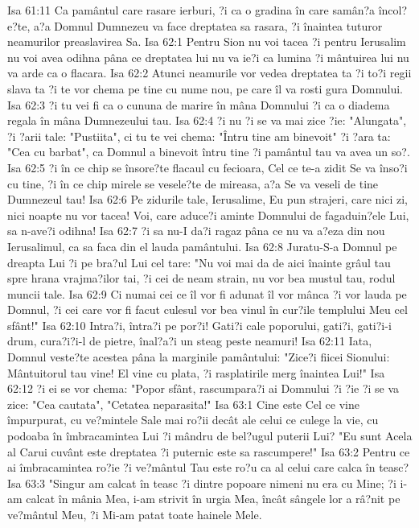 Isa 61:11  Ca pamântul care rasare ierburi, ?i ca o gradina în care samân?a încol?e?te, a?a Domnul Dumnezeu va face dreptatea sa rasara, ?i înaintea tuturor neamurilor preaslavirea Sa.
Isa 62:1  Pentru Sion nu voi tacea ?i pentru Ierusalim nu voi avea odihna pâna ce dreptatea lui nu va ie?i ca lumina ?i mântuirea lui nu va arde ca o flacara.
Isa 62:2  Atunci neamurile vor vedea dreptatea ta ?i to?i regii slava ta ?i te vor chema pe tine cu nume nou, pe care îl va rosti gura Domnului.
Isa 62:3  ?i tu vei fi ca o cununa de marire în mâna Domnului ?i ca o diadema regala în mâna Dumnezeului tau.
Isa 62:4  ?i nu ?i se va mai zice ?ie: "Alungata", ?i ?arii tale: "Pustiita", ci tu te vei chema: "Întru tine am binevoit" ?i ?ara ta: "Cea cu barbat", ca Domnul a binevoit întru tine ?i pamântul tau va avea un so?.
Isa 62:5  ?i în ce chip se însore?te flacaul cu fecioara, Cel ce te-a zidit Se va înso?i cu tine, ?i în ce chip mirele se vesele?te de mireasa, a?a Se va veseli de tine Dumnezeul tau!
Isa 62:6  Pe zidurile tale, Ierusalime, Eu pun strajeri, care nici zi, nici noapte nu vor tacea! Voi, care aduce?i aminte Domnului de fagaduin?ele Lui, sa n-ave?i odihna!
Isa 62:7  ?i sa nu-I da?i ragaz pâna ce nu va a?eza din nou Ierusalimul, ca sa faca din el lauda pamântului.
Isa 62:8  Juratu-S-a Domnul pe dreapta Lui ?i pe bra?ul Lui cel tare: "Nu voi mai da de aici înainte grâul tau spre hrana vrajma?ilor tai, ?i cei de neam strain, nu vor bea mustul tau, rodul muncii tale.
Isa 62:9  Ci numai cei ce îl vor fi adunat îl vor mânca ?i vor lauda pe Domnul, ?i cei care vor fi facut culesul vor bea vinul în cur?ile templului Meu cel sfânt!"
Isa 62:10  Intra?i, întra?i pe por?i! Gati?i cale poporului, gati?i, gati?i-i drum, cura?i?i-l de pietre, înal?a?i un steag peste neamuri!
Isa 62:11  Iata, Domnul veste?te acestea pâna la marginile pamântului: "Zice?i fiicei Sionului: Mântuitorul tau vine! El vine cu plata, ?i rasplatirile merg înaintea Lui!"
Isa 62:12  ?i ei se vor chema: "Popor sfânt, rascumpara?i ai Domnului ?i ?ie ?i se va zice: "Cea cautata", "Cetatea neparasita!"
Isa 63:1  Cine este Cel ce vine împurpurat, cu ve?mintele Sale mai ro?ii decât ale celui ce culege la vie, cu podoaba în îmbracamintea Lui ?i mândru de bel?ugul puterii Lui? "Eu sunt Acela al Carui cuvânt este dreptatea ?i puternic este sa rascumpere!"
Isa 63:2  Pentru ce ai îmbracamintea ro?ie ?i ve?mântul Tau este ro?u ca al celui care calca în teasc?
Isa 63:3  "Singur am calcat în teasc ?i dintre popoare nimeni nu era cu Mine; ?i i-am calcat în mânia Mea, i-am strivit în urgia Mea, încât sângele lor a râ?nit pe ve?mântul Meu, ?i Mi-am patat toate hainele Mele.
